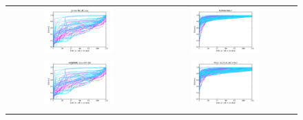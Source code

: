 \begin{figure}[h!]
\begin{tabular}{cc}
\includegraphics[width =0.5\textwidth]{images/thresh_cosine_glossaries_of_tags} 		& \includegraphics[width =0.5\textwidth]{images/thresh_cosine_textvectorizer} \\ \relax
\includegraphics[width =0.5\textwidth]{images/thresh_cosine_weighted_tagvectorizer}	& \includegraphics[width =0.5\textwidth]{images/thresh_cosine_weighted_text_vectorizer} \\ \relax

\end{tabular}
\end{figure}
